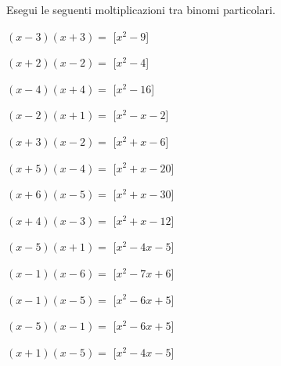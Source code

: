 \begin{esercizio}
 \label{ese:11.}
Esegui le seguenti moltiplicazioni tra binomi particolari.
 \begin{multicols}{2}
\begin{enumeratea}
\spazielenx
\item \(\left(x - 3\right)\left(x + 3\right)=\)
  \hfill [\(x^{2} - 9\)]
\item \(\left(x + 2\right)\left(x - 2\right)=\)
  \hfill [\(x^{2} - 4\)]
\item \(\left(x - 4\right)\left(x + 4\right)=\)
  \hfill [\(x^{2} - 16\)]
\item \(\left(x - 2\right)\left(x + 1\right)=\)
  \hfill [\(x^{2} - x - 2\)]
\item \(\left(x + 3\right)\left(x - 2\right)=\)
  \hfill [\(x^{2} + x - 6\)]
\item \(\left(x + 5\right)\left(x - 4\right)=\)
  \hfill [\(x^{2} + x - 20\)]
\item \(\left(x + 6\right)\left(x - 5\right)=\)
  \hfill [\(x^{2} + x - 30\)]
\item \(\left(x + 4\right)\left(x - 3\right)=\)
  \hfill [\(x^{2} + x - 12\)]
\item \(\left(x - 5\right)\left(x + 1\right)=\)
  \hfill [\(x^{2} - 4 x - 5\)]
\item \(\left(x - 1\right)\left(x - 6\right)=\)
  \hfill [\(x^{2} - 7 x + 6\)]
\item \(\left(x - 1\right)\left(x - 5\right)=\)
  \hfill [\(x^{2} - 6 x + 5\)]
\item \(\left(x - 5\right)\left(x - 1\right)=\)
  \hfill [\(x^{2} - 6 x + 5\)]
\item \(\left(x + 1\right)\left(x - 5\right)=\)
  \hfill [\(x^{2} - 4 x - 5\)]

\end{enumeratea}
\end{multicols}
\end{esercizio}
